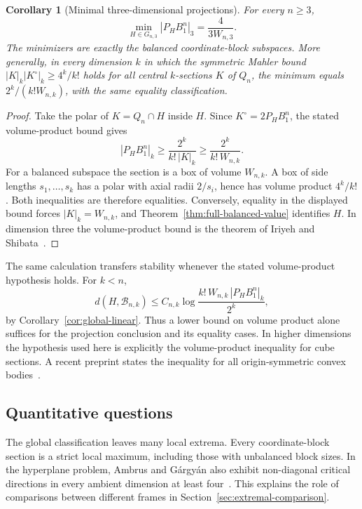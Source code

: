 \documentclass[11pt,a4paper]{article}
\newtheorem{corollary}[theorem]{Corollary}
\theoremstyle{remark}\newtheorem{remark}[theorem]{Remark}
\numberwithin{equation}{section}
\begin{document}
\begin{corollary}[Minimal three-dimensional projections]
\label{cor:polar-minimum}
For every \(n\ge3\),
\[
 \min_{H\in G_{n,3}}|P_H B_1^n|_3=\frac{4}{3W_{n,3}}.
\]
The minimizers are exactly the balanced coordinate-block subspaces.
More generally, in every dimension \(k\) in which the symmetric
Mahler bound \(|K|_k|K^\circ|_k\ge4^k/k!\) holds for all central
\(k\)-sections \(K\) of \(Q_n\), the minimum equals
\(2^k/(k!W_{n,k})\), with the same equality classification.
\end{corollary}
\begin{proof}
Take the polar of \(K=Q_n\cap H\) inside \(H\). Since
\(K^\circ=2P_HB_1^n\), the stated volume-product bound gives
\[
 |P_HB_1^n|_k\ge\frac{2^k}{k!\,|K|_k}
             \ge\frac{2^k}{k!\,W_{n,k}}.
\]
For a balanced subspace the section is a box of volume \(W_{n,k}\).
A box of side lengths \(s_1,\ldots,s_k\) has a polar with axial
radii \(2/s_i\), hence has volume product \(4^k/k!\). Both inequalities
are therefore equalities. Conversely, equality in the displayed bound
forces \(|K|_k=W_{n,k}\), and Theorem~\ref{thm:full-balanced-value}
identifies \(H\). In dimension three the volume-product bound is the
theorem of Iriyeh and Shibata~\cite{IriyehShibata2020}.
\end{proof}

The same calculation transfers stability whenever the stated
volume-product hypothesis holds. For \(k<n\),
\[
 d(H,\mathcal B_{n,k})\le C_{n,k}\log
     \frac{k!\,W_{n,k}\,|P_H B_1^n|_k}{2^k},
\]
by Corollary~\ref{cor:global-linear}. Thus a lower bound on volume
product alone suffices for the projection conclusion and its equality
cases. In higher dimensions the hypothesis used here is explicitly
the volume-product inequality for cube sections. A recent preprint
states the inequality for all origin-symmetric convex
bodies~\cite[Theorem~1.1]{OpenAIMahler2026}.

\subsection{Quantitative questions}

The global classification leaves many local extrema. Every coordinate-block
section is a strict local maximum, including those with unbalanced block
sizes. In the hyperplane problem, Ambrus and G\'argy\'an also exhibit
non-diagonal critical directions in every ambient dimension at least
four~\cite{AG2024}. This explains the role of comparisons between
different frames in Section~\ref{sec:extremal-comparison}.
\end{document}
